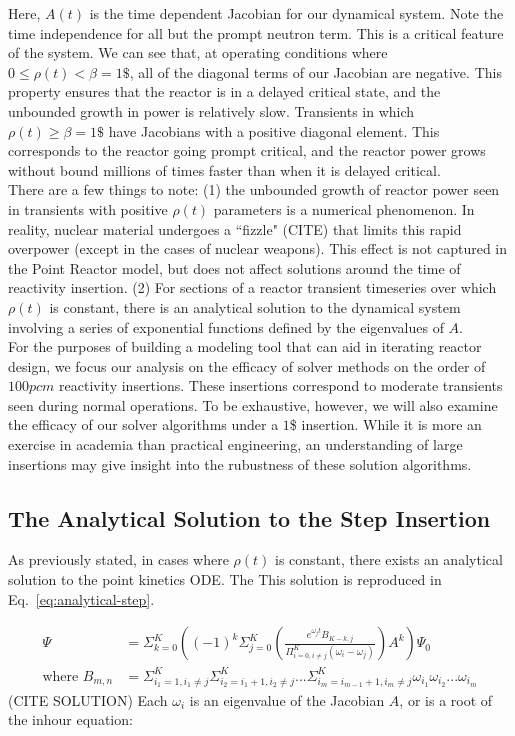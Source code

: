 \documentclass[review,onefignum,onetabnum]{siamart171218}
\begin{document}
Here, $A(t)$ is the time dependent Jacobian for our dynamical system. Note the
time independence for all but the prompt neutron term. This is a critical feature
of the system. We can see that, at operating conditions where $0 \leq \rho(t) < \beta = 1\$$,
all of the diagonal terms of our Jacobian are negative. This property ensures
that the reactor is in a delayed critical state, and the unbounded growth in power
is relatively slow. Transients in which $\rho(t) \geq \beta = 1\$$ have Jacobians with
a positive diagonal element. This corresponds to the reactor going prompt critical, and
the reactor power grows without bound millions of times faster than when it is delayed
critical. \\

There are a few things to note: (1) the unbounded growth of reactor power seen
in transients with positive $\rho(t)$ parameters is a numerical phenomenon. In reality,
nuclear material undergoes a ``fizzle" (CITE) that limits this rapid overpower (except
in the cases of nuclear weapons). This effect is not captured in the Point Reactor
model, but does not affect solutions around the time of reactivity insertion. (2) For
sections of a reactor transient timeseries over which $\rho(t)$ is constant, there is an
analytical solution to the dynamical system involving a series of exponential functions
defined by the eigenvalues of $A$. \\

For the purposes of building a modeling tool that can aid in iterating reactor design,
we focus our analysis on the efficacy of solver methods on the order of $100 pcm$
reactivity insertions. These insertions correspond to moderate transients seen during
normal operations. To be exhaustive, however, we will also examine the efficacy of our
solver algorithms under a $1$\$ insertion. While it is more an exercise in academia than
practical engineering, an understanding of large insertions may give insight into the
rubustness of these solution  algorithms.

\subsection{The Analytical Solution to the Step Insertion}
As previously stated, in cases where $\rho(t)$ is constant, there exists an
analytical solution to the point kinetics ODE. The  This solution is reproduced in
Eq.~\cref{eq:analytical-step}.

\begin{align}
  \label{eq:analytical-step}
  \Psi &= \Sigma_{k=0}^K \left( (-1)^k \Sigma_{j=0}^K \left( \frac{e^{\omega_jt}B_{K-k,j}}{\Pi_{i=0, i\neq j}^K (\omega_i - \omega_j)}\right) A^k\right)\Psi_0\\
  \text{where } B_{m,n} &= \Sigma_{i_1 = 1, i_1 \neq j}^K \Sigma_{i_2 = i_1 + 1, i_2 \neq j}^K ...\Sigma_{i_m = i_{m-1} + 1, i_m \neq j}^K \omega_{i_1}\omega_{i_2}...\omega_{i_m}
\end{align}
(CITE SOLUTION)
Each $\omega_i$ is an eigenvalue of the Jacobian $A$, or is a root of the inhour
equation:
\end{document}
